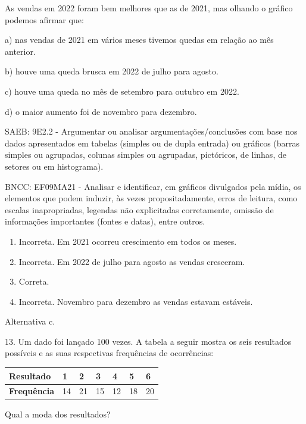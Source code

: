 \begin{escolha}
{{{\begin{escolha}
{{{{{\begin{escolha}
\begin{escolha}
{\begin{q°}
As vendas em 2022 foram bem melhores que as de 2021, mas olhando o
gráfico podemos afirmar que:

a) nas vendas de 2021 em vários meses tivemos quedas em relação ao mês
anterior.

b) houve uma queda brusca em 2022 de julho para agosto.

c) houve uma queda no mês de setembro para outubro em 2022.

d) o maior aumento foi de novembro para dezembro.

SAEB: 9E2.2 - Argumentar ou analisar argumentações/conclusões com base
nos dados apresentados em tabelas (simples ou de dupla entrada) ou
gráficos (barras simples ou agrupadas, colunas simples ou agrupadas,
pictóricos, de linhas, de setores ou em histograma).

BNCC: EF09MA21 - Analisar e identificar, em gráficos divulgados pela
mídia, os elementos que podem induzir, às vezes propositadamente, erros
de leitura, como escalas inapropriadas, legendas não explicitadas
corretamente, omissão de informações importantes (fontes e datas), entre
outros.

\begin{enumerate}

\item
  Incorreta. Em 2021 ocorreu crescimento em todos os meses.
\item
  Incorreta. Em 2022 de julho para agosto as vendas cresceram.
\item
  Correta.
\item
  Incorreta. Novembro para dezembro as vendas estavam estáveis.
\end{enumerate}

Alternativa c.

13. Um dado foi lançado 100 vezes. A tabela a seguir mostra os seis
resultados possíveis e as suas respectivas frequências de ocorrências:

\begin{longtable}[]{@{}lllllll@{}}
\toprule\noalign{}
\textbf{Resultado} & \textbf{1} & \textbf{2} & \textbf{3} & \textbf{4} &
\textbf{5} & \textbf{6} \\
\midrule\noalign{}
\endhead
\bottomrule\noalign{}
\endlastfoot
\textbf{Frequência} & 14 & 21 & 15 & 12 & 18 & 20 \\
\end{longtable}

Qual a moda dos resultados?

\begin{enumerate}


\end{enumerate}
\end{q°}}
\end{escolha}
\end{escolha}}}}}}
\end{escolha}}}}
\end{escolha}
